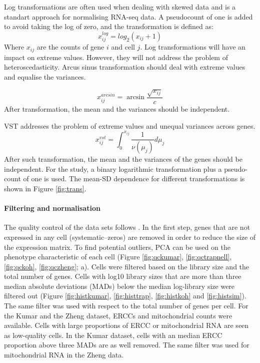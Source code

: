 \documentclass[12pt, a4paper]{article}\usepackage[]{graphicx}\usepackage[]{color}
\begin{document}
Log transformations are often used when dealing with skewed data and is a standart approach for normalising RNA-seq data. A pseudocount of one is added to avoid taking the log of zero, and the transformation is defined as:
\begin{equation}
x_{ij}^{log} = log_{2}(x_{ij} + 1)
\end{equation}
Where $x_{ij}$ are the counts of gene $i$ and cell $j$. Log transformations will have an impact on extreme values. However, they will not address the problem of heteroscedasticity. Arcus sinus transformation should deal with extreme values and equalise the variances. 

\begin{equation}
x_{ij}^{arcsin} = \arcsin \frac{\sqrt{x_{ij}} }{c}
\end{equation}
After transformation, the mean and the variances should be independent. 

VST addresses the problem of extreme values and unequal variances across genes.  
\begin{equation}
x_{ij}^{vst} = \int_{0}^{x_{ij}} \frac{1}{\nu(\mu_j)} d\mu_j
\end{equation}
After such transformation, the mean and the variances of the genes should be independent. For the study, a binary logarithmic transformation plus a pseudo-count of one is used.  The mean-SD dependence for different transformations is shown in Figure \ref{fig:trans}.

\newpage
\paragraph{Filtering and normalisation}
The quality control of the data sets follows \citet{lun2016step}. In the first step, genes that are not expressed in any cell (systematic--zeros) are removed in order to reduce the size of the expression matrix. To find potential outliers, PCA can be used on the phenotype characteristic of each cell (Figure \ref{fig:qckumar}, \ref{fig:qctrapnell}, \ref{fig:qckoh}, \ref{fig:qczheng}; a). Cells were filtered based on the library size and the total number of genes.
Cells with log10 library sizes that are more than three median absolute deviations (MADs) below the median log-library size were filtered out (Figure \ref{fig:histkumar}, \ref{fig:histtrap}, \ref{fig:histkoh} and \ref{fig:histsim}). The same filter was used with respect to the total number of genes per cell. 
For the Kumar and the Zheng dataset, ERCCs and mitochondrial counts were available. Cells with large proportions of ERCC or mitochondrial RNA are seen as low-quality cells. In the Kumar dataset, cells with an median ERCC proportion above three MADs are as well removed. The same filter was used for mitochondrial RNA in the Zheng data.
\end{document}
